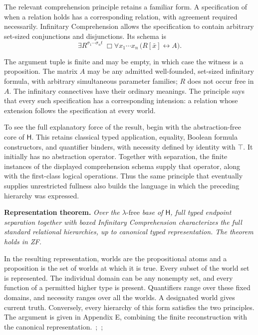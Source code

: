 \documentclass[12pt,letterpaper]{article}
\newcommand{\Hlogic}{\mathsf{H}}
\begin{document}
The relevant comprehension principle retains a familiar form. A specification of when a relation holds has a corresponding relation, with agreement required necessarily. Infinitary Comprehension allows the specification to contain arbitrary set-sized conjunctions and disjunctions. Its schema is
\[
\exists R^{\sigma_1\cdots\sigma_n t}\;\Box\forall x_1\cdots x_n\,\bigl(R[\bar x]\leftrightarrow A\bigr).
\]

The argument tuple is finite and may be empty, in which case the witness is a proposition. The matrix $A$ may be any admitted well-founded, set-sized infinitary formula, with arbitrary simultaneous parameter families; $R$ does not occur free in $A$. The infinitary connectives have their ordinary meanings. The principle says that every such specification has a corresponding intension: a relation whose extension follows the specification at every world.~\cite[\S1]{r18}


To see the full explanatory force of the result, begin with the abstraction-free core of $\Hlogic$. This retains classical typed application, equality, Boolean formula constructors, and quantifier binders, with necessity defined by identity with $\top$. It initially has no abstraction operator. Together with separation, the finite instances of the displayed comprehension schema supply that operator, along with the first-class logical operations. Thus the same principle that eventually supplies unrestricted fullness also builds the language in which the preceding hierarchy was expressed.


\noindent\textbf{Representation theorem.} \emph{Over the $\lambda\text{-free}$ base of $\Hlogic$, full typed endpoint separation together with boxed Infinitary Comprehension characterizes the full standard relational hierarchies, up to canonical typed representation. The theorem holds in ZF.}


In the resulting representation, worlds are the propositional atoms and a proposition is the set of worlds at which it is true. Every subset of the world set is represented. The individual domain can be any nonempty set, and every function of a permitted higher type is present. Quantifiers range over these fixed domains, and necessity ranges over all the worlds. A designated world gives current truth. Conversely, every hierarchy of this form satisfies the two principles. The argument is given in Appendix E, combining the finite reconstruction with the canonical representation.~\cite[\S\S2--5]{r16};~\cite{r17};~\cite[\S4]{r18}
\end{document}
